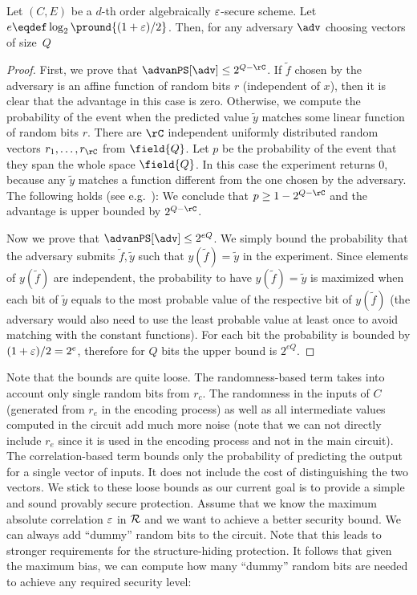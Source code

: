 \begin{proposition}
Let $(C,E)$ be a $d$-th order algebraically $\varepsilon$-secure scheme. Let $e \eqdef \log_2\pround{(1 + \maxcor)/2}$. Then, for any adversary $\adv$ choosing vectors of size~$Q$
\end{proposition}
\begin{proof}
First, we prove that $\advanPS[\adv] \le 2^{Q-\rC}$. If $\tilde{f}$ chosen by the adversary is an affine function of random bits $r$ (independent of $x$), then it is clear that the advantage in this case is zero. Otherwise, we compute the probability of the event when the predicted value $\tilde{y}$ matches some linear function of random bits $r$. There are $\rC$ independent uniformly distributed random vectors $r_1,\ldots, r_{\rC}$ from $\field{Q}$. Let $p$ be the probability of the event that they span the whole space $\field{Q}$. In this case the experiment returns 0, because any $\tilde{y}$ matches a function different from the one chosen by the adversary. The following holds (see e.g.~\cite{matrank}):
We conclude that $p \ge 1 - 2^{Q-\rC}$ and the advantage is upper bounded by $2^{Q-\rC}$.

Now we prove that $\advanPS[\adv] \le 2^{eQ}$. We simply bound the probability that the adversary submits $\tilde{f},\tilde{y}$ such that $y(\tilde{f}) = \tilde{y}$ in the experiment. Since elements of $y(\tilde{f})$ are independent, the probability to have $y(\tilde{f}) = \tilde{y}$ is maximized when each bit of $\tilde{y}$ equals to the most probable value of the respective bit of $y(\tilde{f})$ (the adversary would also need to use the least probable value at least once to avoid matching with the constant functions). For each bit the probability is bounded by $(1+\varepsilon)/2=2^e$, therefore for $Q$ bits the upper bound is $2^{eQ}$.
\end{proof}

Note that the bounds are quite loose. The randomness-based term takes into account only single random bits from $r_c$. The randomness in the inputs of $C$ (generated from $r_e$ in the encoding process) as well as all intermediate values computed in the circuit add much more noise (note that we can not directly include $r_e$ since it is used in the encoding process and not in the main circuit). The correlation-based term bounds only the probability of predicting the output for a single vector of inputs. It does not include the cost of distinguishing the two vectors. We stick to these loose bounds as our current goal is to provide a simple and sound provably secure protection. 
Assume that we know the maximum absolute correlation $\varepsilon$ in $\mathcal{R}$ and we want to achieve a better security bound. We can always add ``dummy'' random bits to the circuit. Note that this leads to stronger requirements for the structure-hiding protection. It follows that given the maximum bias, we can compute how many ``dummy'' random bits are needed to achieve any required security level:

